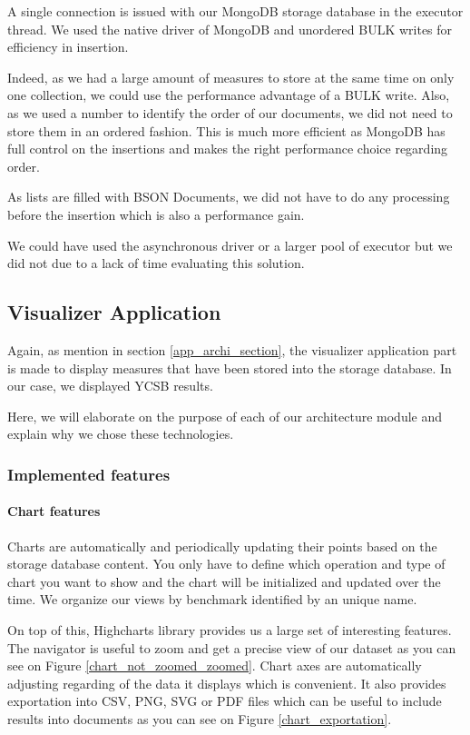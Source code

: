 \documentclass[a4paper,11pt]{report}
\begin{document}
A single connection is issued with our MongoDB storage database in the executor thread. We used the native driver of MongoDB and unordered BULK writes for efficiency in insertion.

Indeed, as we had a large amount of measures to store at the same time on only one collection, we could use the performance advantage of a BULK write. Also, as we used a number to identify the order of our documents, we did not need to store them in an ordered fashion. This is much more efficient as MongoDB has full control on the insertions and makes the right performance choice regarding order. 

As lists are filled with BSON Documents, we did not have to do any processing before the insertion which is also a performance gain. 

\bigskip

We could have used the asynchronous driver or a larger pool of executor but we did not due to a lack of time evaluating this solution.

\subsection{Visualizer Application}

Again, as mention in section \ref{app_archi_section}, the visualizer application part is made to display measures that have been stored into the storage database. In our case, we displayed YCSB results. 

Here, we will elaborate on the purpose of each of our architecture module and explain why we chose these technologies.

\subsubsection{Implemented features}

\paragraph{Chart features}

Charts are automatically and periodically updating their points based on the storage database content. You only have to define which operation and type of chart you want to show and the chart will be initialized and updated over the time. We organize our views by benchmark identified by an unique name.

On top of this, Highcharts library \cite{highcharts:website} provides us a large set of interesting features. 
The navigator is useful to zoom and get a precise view of our dataset as you can see on Figure \ref{chart_not_zoomed_zoomed}. 
Chart axes are automatically adjusting regarding of the data it displays which is convenient. 
It also provides exportation into CSV, PNG, SVG or PDF files which can be useful to include results into documents as you can see on Figure \ref{chart_exportation}.
\end{document}
